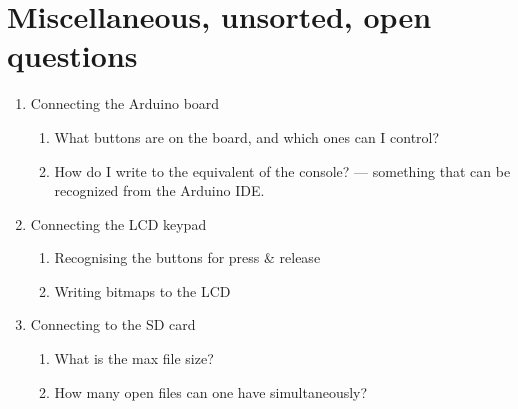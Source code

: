 \documentclass[11pt]{article}
\begin{document}
\section{Miscellaneous, unsorted, open questions}
\label{sec-6}
\begin{enumerate}
\item Connecting the Arduino board
\begin{enumerate}
\item What buttons are on the board, and which ones can I control?
\item How do I write to the equivalent of the console? --- something that can be recognized from the Arduino IDE.
\end{enumerate}
\item Connecting the LCD keypad
\begin{enumerate}
\item Recognising the buttons for press \& release
\item Writing bitmaps to the LCD
\end{enumerate}
\item Connecting to the SD card
\begin{enumerate}
\item What is the max file size?
\item How many open files can one have simultaneously?
\end{enumerate}
\end{enumerate}
\end{document}
